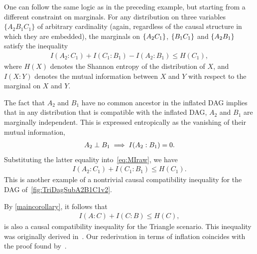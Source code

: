 {One can follow the same logic as in the preceding example, but starting from a different constraint on marginals.  For any distribution on three variables $\{A_2 B_1 C_1\}$ of arbitrary cardinality (again, regardless of the causal structure in which they are embedded), the marginals on $\left\lbrace A_2 C_1\right\rbrace$, $\left\lbrace B_1 C_1\right\rbrace$ and $\left\lbrace A_2 B_1\right\rbrace$ satisfy the inequality~\cite[Eq.~(29)]{fritz2013marginal}
\label{example:entropic}\begin{align}\label{eq:MIraw}
	I(A_2 : C_1) + I(C_1 : B_1) - I(A_2 : B_1) \leq H(C_1),	
\end{align}
where $H(X)$ denotes the Shannon entropy of the distribution of $X$, and $I(X: Y)$ denotes the mutual information between $X$ and $Y$ with respect to the marginal on $X$ and $Y$.

The fact that $A_2$ and $B_1$ have no common ancestor in the inflated DAG implies that in any distribution that is compatible with the inflated DAG, $A_2$ and $B_1$ are marginally independent.  This is expressed entropically as the vanishing of their mutual information, 
\begin{align}\label{entropicfact}
A_2 \perp B_1 \implies  I(A_2 : B_1)  =0.
\end{align}
Substituting the latter equality into~\cref{eq:MIraw}, we have
\begin{align}
	I(A_2 : C_1) + I(C_1 : B_1)  \leq H(C_1).
\end{align}
This is another example of a nontrivial causal compatibility inequality for the DAG of~\cref{fig:TriDagSubA2B1C1v2}.  

By \cref{maincorollary}, it follows that 
\begin{align}\label{eq:monogomyofcorrelations}
	I(A : C) + I(C : B) \leq H(C),
\end{align}
is also a causal compatibility inequality for the Triangle scenario.  This inequality was originally derived in~\cite{fritz2012bell}. Our rederivation in terms of inflation coincides with the proof found by~\citet{pusey2014gdag}.

}

